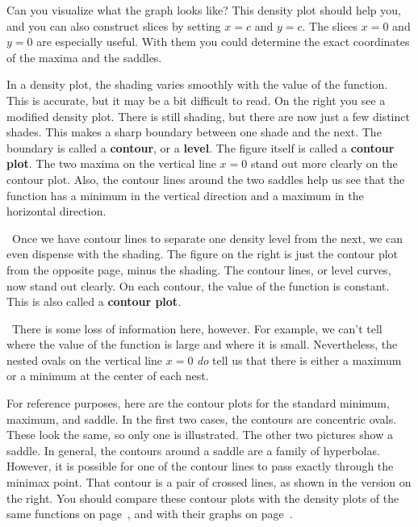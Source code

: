 {{{{\noindent
Can you visualize what the graph looks like?  This density plot should help you, and you can also construct slices by setting $x = c$ and $y = c$.  The slices $x = 0$ and $y = 0$ are especially useful.  With them you could determine the exact coordinates of the maxima and the saddles.


	In a density plot, the shading varies smoothly with the value of the function.  This is accurate, but it may be a bit difficult to read.  On the right you see a modified density plot.  There is still shading, but there are now just a few distinct shades.  
This makes a sharp boundary between one shade and the next.  The boundary is called a {\bf contour}, or a {\bf level}.  The figure itself is called a {\bf contour plot}.  The two maxima on the vertical line $x = 0$ stand out more clearly on the contour plot.  Also, the contour lines around the two saddles help us see that the function has a minimum in the vertical direction and a maximum in the horizontal direction. 
 


\noindent
\quad \ Once we have contour lines to separate one density level from the next, we can even dispense with the shading.  The figure on the right is just the contour plot from the opposite page, minus the shading.  The contour lines, or level curves, now stand out clearly.  On each contour, the value of the function is constant.  This is also called a {\bf contour plot}.  

\quad \ There is some loss of information here, however.  For example, we can't tell where the value of the function is large and where it is small.  Nevertheless, the nested ovals on the vertical line $x = 0$ {\em do\/} tell us that there is either a maximum or a minimum at the center of each nest.
\vspace{5pt}

	For reference purposes, here are the contour plots for the standard minimum, maximum, and saddle.  In the first two cases, the contours are concentric ovals.  
These look the same, so only one is illustrated.  The other two pictures show a saddle.  In general, the contours around a saddle are a family of hyperbolas.  However, it is possible for one of the contour lines to pass exactly through the minimax point.  That contour is a pair of crossed lines, as shown in the version on the right.  You should compare these contour plots with the density plots of the same functions on page~\pageref{density}, and with their graphs on page~\pageref{saddle}.
	
}}}}
